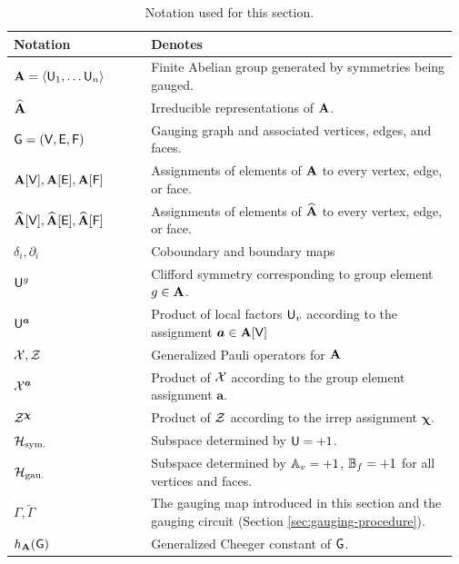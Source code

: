 \documentclass[11pt]{article}
\begin{document}
\begin{table}[H]
    \centering
    \begin{tabular}{@{}p{0.30\linewidth}p{0.67\linewidth}@{}}
    \hline
        Notation & Denotes \\
    \hline
        $\mathbf{A} = \langle \mathsf{U}_1, \dots \mathsf{U}_n \rangle$ & Finite Abelian group generated by symmetries being gauged. \\
        $\widehat{\mathbf{A}}$ & Irreducible representations of $\mathbf{A}$.\\
        $\mathsf{G} = (\mathsf{V}, \mathsf{E}, \mathsf{F})$ & Gauging graph and associated vertices, edges, and faces. \\
        $\mathbf{A}[\mathsf{V}], \mathbf{A}[\mathsf{E}], \mathbf{A}[\mathsf{F}]$ & Assignments of elements of $\mathbf{A}$ to every vertex, edge, or face. \\
        $\widehat{\mathbf{A}}[\mathsf{V}], \widehat{\mathbf{A}}[\mathsf{E}], \widehat{\mathbf{A}}[\mathsf{F}]$ & Assignments of elements of $\widehat{\mathbf{A}}$ to every vertex, edge, or face. \\
        $\delta_i, \partial_i$ & Coboundary and boundary maps \\
        $\mathsf{U}^g$ & Clifford symmetry corresponding to group element $g \in \mathbf{A}$.\\
        $\mathsf{U}^{\bm{a}}$ & Product of local factors $\mathsf{U}_v$ according to the assignment $\bm{a} \in \mathbf{A}[\mathsf{V}]$\\
        $\mathcal{X}, \mathcal{Z}$ & Generalized Pauli operators for $\mathbf{A}$\\
        $\mathcal{X}^{\bm{a}}$ & Product of $\mathcal{X}$ according to the group element assignment $\bm{a}$.\\
        $\mathcal{Z}^{\bm{\chi}}$ & Product of $\mathcal{Z}$ according to the irrep assignment $\bm{\chi}$. \\
        $\mathcal{H}_{\rm{sym.}}$ & Subspace determined by $\mathsf{U} = +1$. \\
        $\mathcal{H}_{\rm{gau.}}$ & Subspace determined by $\mathbb{A}_v = +1$, $\mathbb{B}_f = +1$ for all vertices and faces. \\
        $\Gamma, \tilde{\Gamma}$ & The gauging map introduced in this section and the gauging circuit (Section \ref{sec:gauging-procedure}). \\
        $h_{\mathbf{A}}(\mathsf{G})$ & Generalized Cheeger constant of $\mathsf{G}$.
        
    \end{tabular}
    \caption{Notation used for this section.}
    \label{tab:sec-3-notation}
\end{table}
\end{document}
